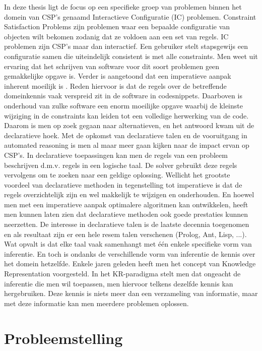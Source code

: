In deze thesis ligt de focus op een specifieke groep van problemen binnen het domein van CSP's genaamd Interactieve Configuratie (IC) problemen. Constraint Satisfaction Problems zijn problemen waar een bepaalde configuratie van objecten wilt bekomen zodanig dat ze voldoen aan een set van regels. IC problemen zijn CSP's maar dan interactief. Een gebruiker stelt stapsgewijs een configuratie samen die uiteindelijk consistent is met alle constraints. Men weet uit ervaring dat het schrijven van software voor dit soort problemen geen gemakkelijke opgave is. Verder is aangetoond dat een imperatieve aanpak inherent moeilijk is \citep{gelle1996interactive}. Reden hiervoor is dat de regels over de betreffende domeinkennis vaak verspreid zit in de software in codesnippets. Daarboven is onderhoud van zulke software een enorm moeilijke opgave waarbij de kleinste wijziging in de constraints kan leiden tot een volledige herwerking van de code. Daarom is men op zoek gegaan naar alternatieven, en het antwoord kwam uit de declaratieve hoek. Met de opkomst van declaratieve talen en de vooruitgang in automated reasoning is men al maar meer gaan kijken naar de impact ervan op CSP's. In declaratieve toepassingen kan men de regels van een probleem beschrijven d.m.v. regels in een logische taal. De solver gebruikt deze regels vervolgens om te zoeken naar een geldige oplossing. Wellicht het grootste voordeel van declaratieve methoden in tegenstelling tot imperatieve is dat de regels overzichtelijk zijn en wel makkelijk te wijzigen en  onderhouden. En hoewel men met een imperatieve aanpak optimalere algoritmen kan ontwikkelen, heeft men kunnen laten zien dat declaratieve methoden ook goede prestaties kunnen neerzetten. De interesse in declaratieve talen is de laatste decennia toegenomen en als resultaat zijn er een hele resem talen verschenen (Prolog, Ant, Lisp, ...). Wat opvalt is dat elke taal vaak samenhangt met \'{e}\'{e}n enkele specifieke vorm van inferentie. En toch is ondanks de verschillende vorm van inferentie de kennis over het domein hetzelfde. Enkele jaren geleden heeft men het concept van Knowledge Representation \citep{denecker2008building} voorgesteld. In het KR-paradigma stelt men dat ongeacht de inferentie die men wil toepassen, men hiervoor telkens dezelfde kennis kan hergebruiken. Deze kennis is niets meer dan een verzameling van informatie, maar met deze informatie kan men meerdere problemen oplossen. 

\section{Probleemstelling}

